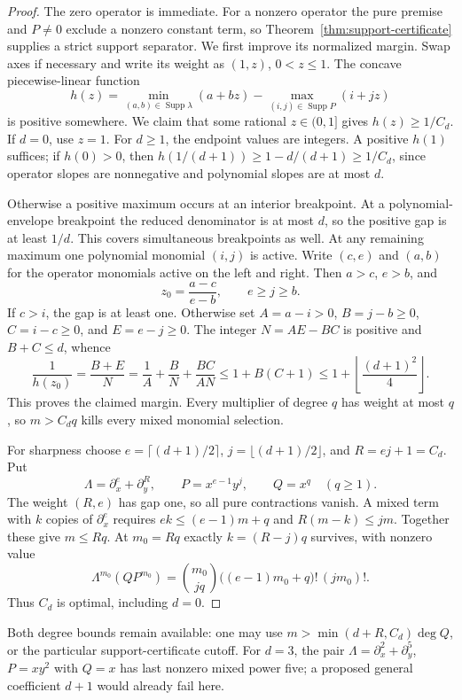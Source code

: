 \documentclass[11pt]{article}
\newcommand{\Supp}{\operatorname{Supp}}
\begin{document}
\begin{proof}
The zero operator is immediate.  For a nonzero operator the pure premise
and $P\ne0$ exclude a nonzero constant term, so
Theorem~\ref{thm:support-certificate} supplies a strict support separator.
We first improve its normalized margin.
Swap axes if necessary and write its weight as $(1,z)$, $0<z\le1$.
The concave piecewise-linear function
\[
 h(z)=\min_{(a,b)\in\Supp\lambda}(a+bz)
       -\max_{(i,j)\in\Supp P}(i+jz)
\]
is positive somewhere. We claim that some rational $z\in(0,1]$ gives
$h(z)\ge1/C_d$. If $d=0$, use $z=1$. For $d\ge1$, the endpoint values
are integers. A positive $h(1)$ suffices; if $h(0)>0$, then
$h(1/(d+1))\ge1-d/(d+1)\ge1/C_d$, since operator slopes are nonnegative
and polynomial slopes are at most $d$.

Otherwise a positive maximum occurs at an interior breakpoint. At a
polynomial-envelope breakpoint the reduced denominator is at most $d$,
so the positive gap is at least $1/d$. This covers simultaneous
breakpoints as well. At any remaining maximum one polynomial monomial
$(i,j)$ is active. Write $(c,e)$ and $(a,b)$ for the operator monomials
active on the left and right. Then $a>c$, $e>b$, and
\[
 z_0=\frac{a-c}{e-b},\qquad e\ge j\ge b.
\]
If $c>i$, the gap is at least one. Otherwise set
$A=a-i>0$, $B=j-b\ge0$, $C=i-c\ge0$, and $E=e-j\ge0$.
The integer $N=AE-BC$ is positive and $B+C\le d$, whence
\[
 \frac1{h(z_0)}=\frac{B+E}{N}
 =\frac1A+\frac B N+\frac{BC}{AN}
 \le1+B(C+1)\le1+\left\lfloor\frac{(d+1)^2}{4}\right\rfloor.
\]
This proves the claimed margin. Every multiplier of degree $q$ has weight
at most $q$, so $m>C_dq$ kills every mixed monomial selection.

For sharpness choose $e=\lceil(d+1)/2\rceil$, $j=\lfloor(d+1)/2\rfloor$,
and $R=ej+1=C_d$. Put
\[
 \Lambda=\partial_x^e+\partial_y^R,\qquad P=x^{e-1}y^j,
 \qquad Q=x^q\quad(q\ge1).
\]
The weight $(R,e)$ has gap one, so all pure contractions vanish.
A mixed term with $k$ copies of $\partial_x^e$ requires
$ek\le(e-1)m+q$ and $R(m-k)\le jm$. Together these give $m\le Rq$.
At $m_0=Rq$ exactly $k=(R-j)q$ survives, with nonzero value
\[
 \Lambda^{m_0}(QP^{m_0})
 =\binom{m_0}{jq}\bigl((e-1)m_0+q\bigr)!\,(jm_0)!.
\]
Thus $C_d$ is optimal, including $d=0$.
\end{proof}

Both degree bounds remain available: one may use
$m>\min(d+R,C_d)\deg Q$, or the particular support-certificate cutoff.
For $d=3$, the pair $\Lambda=\partial_x^2+\partial_y^5$, $P=xy^2$
with $Q=x$ has last nonzero mixed power five; a proposed general
coefficient $d+1$ would already fail here.
\end{document}
